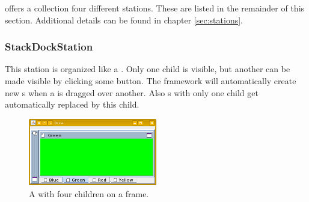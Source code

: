  offers a collection four different stations. These are listed in the remainder of this section. Additional details can be found in chapter \ref{sec:stations}.

\subsubsection{StackDockStation}
This station is organized like a . Only one child is visible, but another can be made visible by clicking some button. The framework will automatically create new s when a  is dragged over another. Also s with only one child get automatically replaced by this child.

\begin{figure}[h!]
  \centering
    \includegraphics[width=0.5\textwidth]{basics/StackDockStation}
  \caption{A  with four children on a frame.}
\end{figure}


